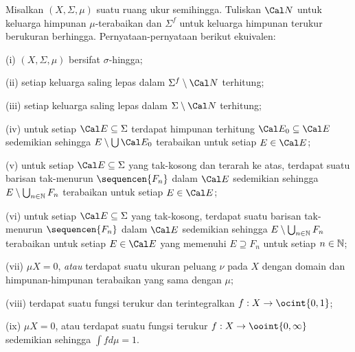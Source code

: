  Misalkan $(X,\Sigma,\mu)$ suatu ruang ukur
semihingga. Tuliskan $\Cal N$ untuk keluarga himpunan $\mu$-terabaikan
dan $\Sigma^f$ untuk keluarga himpunan terukur berukuran berhingga.
Pernyataan-pernyataan berikut ekuivalen:

(i) $(X,\Sigma,\mu)$ bersifat $\sigma$-hingga;

(ii) setiap keluarga saling lepas dalam $\Sigma^f\setminus\Cal N$
terhitung;

(iii) setiap keluarga saling lepas dalam $\Sigma\setminus\Cal N$
terhitung;

(iv) untuk setiap $\Cal E\subseteq\Sigma$ terdapat himpunan terhitung
$\Cal E_0\subseteq\Cal E$ sedemikian sehingga
$E\setminus\bigcup\Cal E_0$ terabaikan untuk setiap $E\in\Cal E$;

(v) untuk setiap $\Cal E\subseteq\Sigma$ yang tak-kosong dan terarah ke
atas, terdapat suatu barisan tak-menurun $\sequencen{F_n}$ dalam
$\Cal E$ sedemikian sehingga
$E\setminus\bigcup_{n\in\Bbb N}F_n$ terabaikan untuk setiap
$E\in\Cal E$;

(vi) untuk setiap $\Cal E\subseteq\Sigma$ yang tak-kosong, terdapat suatu
barisan tak-menurun $\sequencen{F_n}$ dalam $\Cal E$ sedemikian sehingga
$E\setminus\bigcup_{n\in\Bbb N}F_n$ terabaikan untuk setiap $E\in\Cal E$
yang memenuhi $E\supseteq F_n$ untuk setiap $n\in\Bbb N$;

(vii) {\it $\mu X=0$}, {\it atau} terdapat suatu ukuran
peluang $\nu$ pada $X$ dengan domain dan himpunan-himpunan terabaikan yang
sama dengan $\mu$;

(viii) terdapat suatu fungsi terukur dan terintegralkan
$f:X\to\ocint{0,1}$;

(ix) $\mu X=0$, atau terdapat suatu fungsi terukur
$f:X\to\ooint{0,\infty}$ sedemikian sehingga $\int fd\mu=1$.

